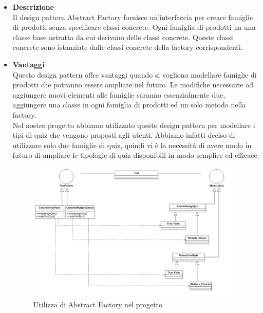 		\begin{itemize}
			\item \textbf{Descrizione}\\ 
			Il design pattern Abstract Factory fornisce un'interfaccia per creare famiglie di prodotti senza specificare classi concrete. Ogni famiglia di prodotti ha una classe base astratta da cui derivano delle classi concrete. Queste classi concrete sono istanziate dalle classi concrete della factory corrispondenti.
			
			\item \textbf{Vantaggi}\\ 
			Questo design pattern offre vantaggi quando si vogliono modellare famiglie di prodotti che potranno essere ampliate nel futuro. Le modifiche necessarie ad aggiungere nuovi elementi alle famiglie saranno essenzialmente due, aggiungere una classe in ogni famiglia di prodotti ed un solo metodo nella factory.
			\utilizzo \\ 
			Nel nostro progetto abbiamo utilizzato questo design pattern per modellare i tipi di quiz che vengono proposti agli utenti. Abbiamo infatti deciso di utilizzare solo due famiglie di quiz, quindi vi è la necessità di avere modo in futuro di ampliare le tipologie di quiz disponibili in modo semplice ed efficace.
			
			\begin{figure}[!h]
				\centering
				\includegraphics[scale=0.4]{img/our_abstract_factory}  
				\caption{Utilizzo di Abstract Factory nel progetto}
			\end{figure}
			
		\end{itemize}
		
